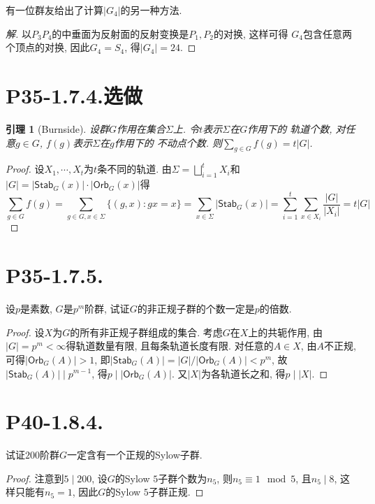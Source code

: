 \documentclass[12pt, a4paper, fontset=windows]{ctexart}
\newcommand{\Orb}{\mathsf{Orb}}
\newcommand{\Stab}{\mathsf{Stab}}
\newcommand{\abs}[1]{\left|{#1}\right|}
\newcommand{\xuan}{{\normalsize 选做}}
\newtheorem*{lemma}{引理}
\newenvironment{solution}{\begin{proof}[解]}{\end{proof}}
\begin{document}
有一位群友给出了计算$\abs{G_4}$的另一种方法. 

\begin{solution}
以$P_3P_4$的中垂面为反射面的反射变换是$P_1,P_2$的对换, 这样可得
$G_4$包含任意两个顶点的对换, 因此$G_4=S_4$, 得$\abs{G_4}=24$. 
\end{solution}

\section*{P35-1.7.4.\xuan}

\begin{lemma}[Burnside]
设群$G$作用在集合$\Sigma$上. 令$t$表示$\Sigma$在$G$作用下的
轨道个数, 对任意$g\in G$, $f(g)$表示$\Sigma$在$g$作用下的
不动点个数. 则$\sum_{g\in G}f(g)=t\abs{G}$. 
\end{lemma}

\begin{proof}
设$X_1,\cdots,X_t$为$t$条不同的轨道. 
由$\Sigma=\bigsqcup^t_{i=1}X_i$和
$\abs{G}=\abs{\Stab_{G}(x)}\cdot\abs{\Orb_{G}(x)}$得
\[\sum_{g\in G}f(g)
=\sum_{g\in G,x\in\Sigma}\{(g,x):gx=x\}
=\sum_{x\in\Sigma}\abs{\Stab_{G}(x)}
=\sum^t_{i=1}\sum_{x\in X_i}\frac{\abs{G}}{\abs{X_i}}
=t\abs{G}\]
\end{proof}

\section*{P35-1.7.5.}

设$p$是素数, $G$是$p^m$阶群, 试证$G$的非正规子群的个数一定是$p$的倍数. 

\begin{proof}
设$X$为$G$的所有非正规子群组成的集合. 考虑$G$在$X$上的共轭作用, 
由$\abs{G}=p^m<\infty$得轨道数量有限, 且每条轨道长度有限. 
对任意的$A\in X$, 由$A$不正规, 可得$\abs{\Orb_{G}(A)}>1$, 
即$\abs{\Stab_{G}(A)}=\abs{G}/\abs{\Orb_{G}(A)}<p^m$, 
故$\abs{\Stab_{G}(A)}\mid p^{m-1}$, 得$p\mid\abs{\Orb_{G}(A)}$. 
又$\abs{X}$为各轨道长之和, 得$p\mid\abs{X}$. 
\end{proof}

\section*{P40-1.8.4.}

试证$200$阶群$G$一定含有一个正规的Sylow子群. 

\begin{proof}
注意到$5\mid 200$, 设$G$的Sylow $5$子群个数为$n_5$, 
则$n_5\equiv 1\mod{5}$, 且$n_5\mid 8$, 这样只能有$n_5=1$, 
因此$G$的Sylow $5$子群正规. 
\end{proof}
\end{document}
